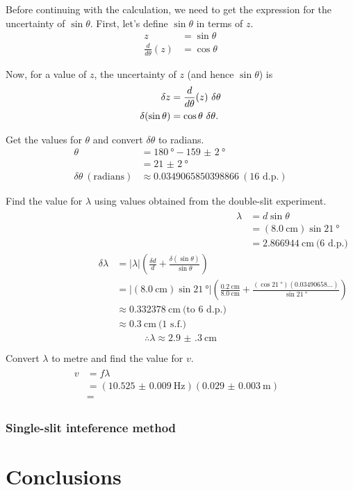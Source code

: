 \documentclass[letter,12pt]{article}
\newcommand{\tlambda}{\(\lambda\) }
\newcommand{\ttheta}{\(\theta\) }
\numberwithin{equation}{section}
\numberwithin{figure}{section}
\numberwithin{table}{section}
\begin{document}
Before continuing with the calculation, we need to get the expression for the uncertainty of \(\sin{} \theta\). First, let's define \(\sin \theta\) in terms of \(z\).
\begin{align*}
  z &= \sin \theta \\
  \frac{d}{d\theta}(z) &= \cos \theta 
\end{align*}

Now, for a value of \(z\), the uncertainty of \(z\) (and hence \(\sin \theta \)) is
\begin{align} \label{eq:e2}
  \delta z &= \frac{d}{d \theta}(z) \  \delta \theta \notag \\
  \delta (\sin \theta) &= \cos \theta \ \delta \theta.
\end{align}

Get the values for \ttheta and convert \(\delta\theta\) to radians.
\begin{align*}
  \theta &= \SI{180}{\degree} - \SI{159(2)}{\degree} \\
  &= \SI{21(2)}{\degree} \\
  \delta \theta \ (\mathrm{radians}) &\approx 0.0349065850398866 \ (\text{16 d.p.})
\end{align*}

Find the value for \tlambda using values obtained from the double-slit experiment.
\begin{align*}
  \begin{split}
    \lambda &= d \sin \theta \\
    &= (\SI{8.0}{\cm}) \sin{\SI{21}{\degree}} \\
    &= \SI{2.866944}{\cm} \ \text{(6 d.p.)}
  \end{split}
  \begin{split}
    \delta \lambda &= |\lambda| \left( \frac{\delta d}{d} + \frac{\delta (\sin\theta)}{\sin \theta} \right) \\
    &= |(\SI{8.0}{\cm}) \sin{\SI{21}{\degree}}| \left( \frac{\SI{0.2}{\cm}}{\SI{8.0}{\cm}} + \frac{(\cos{\SI{21}{\degree}})(0.03490658\dots)}{\sin{\SI{21}{\degree}}} \right) \\
    &\approx \SI{0.332378}{\cm} \ \text{(to 6 d.p.)} \\
    &\approx \SI{0.3}{\cm} \ \text{(1 s.f.)}
  \end{split}
\end{align*}
\[\therefore \lambda \approx \SI{2.9(3)}{\cm}\]

Convert \tlambda to metre and find the value for \(v\).
\begin{align*}
  \begin{split}
  v &= f \lambda \\
  &= (\SI{10.525(9)}{\hertz})(\SI{0.029(3)}{\m}) \\
  &= \SI{}
  \end{split}
  \begin{split}
    
  \end{split}
\end{align*}

\subsubsection{Single-slit inteference method}

\section{Conclusions}
\end{document}
